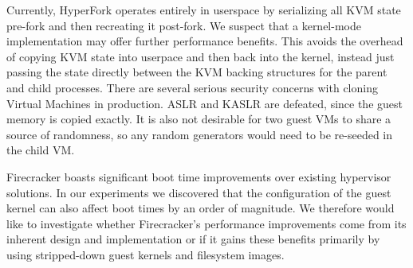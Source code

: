 Currently, HyperFork operates entirely in userspace by serializing all KVM
state pre-fork and then recreating it post-fork. We suspect that a kernel-mode
implementation may offer further performance benefits. This avoids the overhead
of copying KVM state into userpace and then back into the kernel, instead just
passing the state directly between the KVM backing structures for the parent
and child processes. There are several serious security concerns with cloning
Virtual Machines in production. ASLR and KASLR are defeated, since the guest
memory is copied exactly. It is also not desirable for two guest VMs to share a
source of randomness, so any random generators would need to be re-seeded in
the child VM.

Firecracker boasts significant boot time improvements over existing hypervisor
solutions. In our experiments we discovered that the configuration of the guest
kernel can also affect boot times by an order of magnitude. We therefore would
like to investigate whether Firecracker's performance improvements come from
its inherent design and implementation or if it gains these benefits primarily
by using stripped-down guest kernels and filesystem images.
